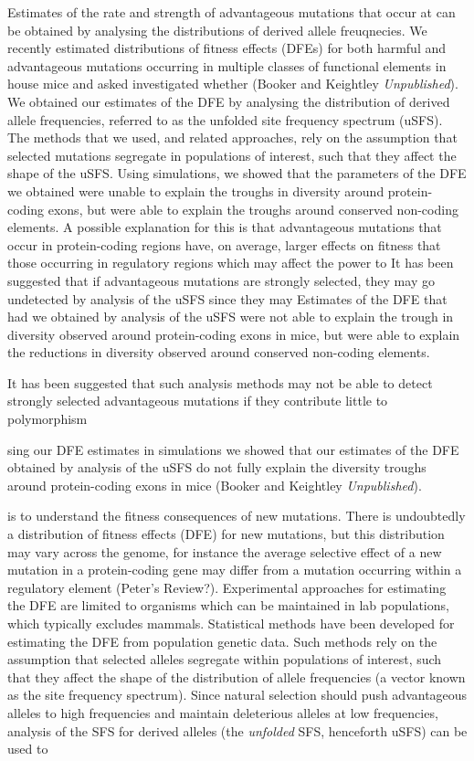 \documentclass[11pt]{article}
\begin{document}
Estimates of the rate and strength of advantageous mutations that occur at can be obtained by analysing the distributions of derived allele freuqnecies.
We recently estimated distributions of fitness effects (DFEs) for both harmful and advantageous mutations occurring in multiple classes of functional elements in house mice and asked investigated whether  (Booker and Keightley \textit{Unpublished}). We obtained our estimates of the DFE by analysing the distribution of derived allele frequencies, referred to as the unfolded site frequency spectrum (uSFS). The methods that we used, and related approaches, rely on the assumption that selected mutations segregate in populations of interest, such that they affect the shape of the uSFS. Using simulations, we showed that the parameters of the DFE we obtained were unable to explain the troughs in diversity around protein-coding exons, but were able to explain the troughs around conserved non-coding elements. A possible explanation for this is that advantageous mutations that occur in protein-coding regions have, on average, larger effects on fitness that those occurring in regulatory regions which may affect the power to 
It has been suggested that if advantageous mutations are strongly selected, they may go undetected by analysis of the uSFS since they may 
 Estimates of the DFE that had we obtained by analysis of the uSFS were not able to explain the trough in diversity observed around protein-coding exons in mice, but were able to explain the reductions in diversity observed around conserved non-coding elements. 

It has been suggested that such analysis methods may not be able to detect strongly selected advantageous mutations if they contribute little to polymorphism

sing our DFE estimates in simulations we showed that our estimates of the DFE obtained by analysis of the uSFS do not fully explain the diversity troughs around protein-coding exons in mice (Booker and Keightley \textit{Unpublished}). 


 is to understand the fitness consequences of new mutations. There is undoubtedly a distribution of fitness effects (DFE) for new mutations, but this distribution may vary across the genome, for instance the average selective effect of a new mutation in a protein-coding gene may differ from a mutation occurring within a regulatory element (Peter's Review?). Experimental approaches for estimating the DFE are limited to organisms which can be maintained in lab populations, which typically excludes mammals. Statistical methods have been developed for estimating the DFE from population genetic data. Such methods rely on the assumption that selected alleles segregate within populations of interest, such that they affect the shape of the distribution of allele frequencies (a vector known as the site frequency spectrum). Since natural selection should push advantageous alleles to high frequencies and maintain deleterious alleles at low frequencies, analysis of the SFS for derived alleles (the \textit{unfolded} SFS, henceforth uSFS) can be used to 
\end{document}
